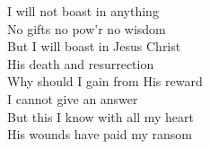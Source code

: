 \documentclass[aspectratio=169]{beamer}
\begin{document}
{\begin{frame}{}
\end{frame}
\hypertarget{How deep the Father's love for us[](Townend)3}{}
\begin{frame}{}
\fontsize{18.75}{22.5}\selectfont

I will not boast in anything\\ 
No gifts no pow’r no wisdom\\ 
But I will boast in Jesus Christ\\ 
His death and resurrection\\ 
Why should I gain from His reward\\ 
I cannot give an answer\\ 
But this I know with all my heart\\ 
His wounds have paid my ransom

\end{frame}
}
\end{document}
